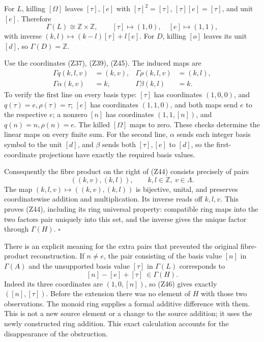 \documentclass[
]{article}
\begin{document}
For \(L\), killing \([\Omega]\) leaves \([\tau],[e]\) with
\([\tau]^2=[\tau]\), \([\tau][e]=[\tau]\), and unit \([e]\). Therefore
\[
\Gamma(L)\cong\mathbb Z\times\mathbb Z,\qquad
[\tau]\mapsto(1,0),\quad[e]\mapsto(1,1),
\tag{Z45}
\] with inverse \((k,l)\mapsto(k-l)[\tau]+l[e]\). For \(D\), killing
\([o]\) leaves its unit \([d]\), so \(\Gamma(D)=\mathbb Z\).

Use the coordinates (Z37), (Z39), (Z45). The induced maps are \[
\begin{aligned}
\Gamma q(k,l,v)&=(k,v),&
\Gamma\rho(k,l,v)&=(k,l),\\
\Gamma\alpha(k,v)&=k,&
\Gamma\beta(k,l)&=k.
\end{aligned}
\tag{Z46}
\] To verify the first line on every basis type: \([\tau]\) has
coordinates \((1,0,0)\), and \(q(\tau)=e,\rho(\tau)=\tau\); \([e]\) has
coordinates \((1,1,0)\), and both maps send \(e\) to the respective
\(e\); a nonzero \([n]\) has coordinates \((1,1,[n])\), and
\(q(n)=n,\rho(n)=e\). The killed \([\Omega]\) maps to zero. These checks
determine the linear maps on every finite sum. For the second line,
\(\alpha\) sends each integer basis symbol to the unit \([d]\), and
\(\beta\) sends both \([\tau],[e]\) to \([d]\), so the first-coordinate
projections have exactly the required basis values.

Consequently the fibre product on the right of (Z44) consists precisely
of pairs \[
((k,v),(k,l)),\qquad k,l\in\mathbb Z,\ v\in\Lambda.
\] The map \((k,l,v)\mapsto((k,v),(k,l))\) is bijective, unital, and
preserves coordinatewise addition and multiplication. Its inverse reads
off \(k,l,v\). This proves (Z44), including its ring universal property:
compatible ring maps into the two factors pair uniquely into this set,
and the inverse gives the unique factor through \(\Gamma(H)\).
\(\square\)

There is an explicit meaning for the extra pairs that prevented the
original fibre-product reconstruction. If \(n\ne e\), the pair
consisting of the basis value \([n]\) in \(\Gamma(A)\) and the
unsupported basis value \([\tau]\) in \(\Gamma(L)\) corresponds to \[
[n]-[e]+[\tau]\ \in\Gamma(H).
\tag{Z47}
\] Indeed its three coordinates are \((1,0,[n])\), so (Z46) gives
exactly \(([n],[\tau])\). Before the extension there was no element of
\(H\) with those two observations. The monoid ring supplies a formal
additive difference with them. This is not a new source element or a
change to the source addition; it uses the newly constructed ring
addition. This exact calculation accounts for the disappearance of the
obstruction.
\end{document}

